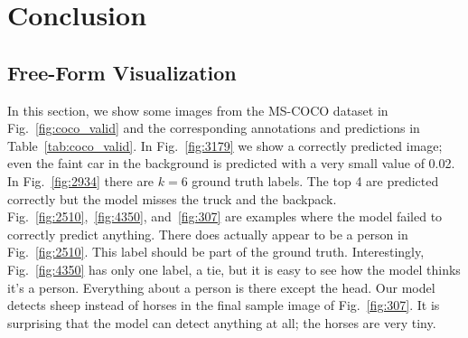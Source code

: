 \documentclass[12pt,journal,compsoc]{IEEEtran}
\begin{document}




\section{Conclusion} %
\subsection{Free-Form Visualization}



In this section, we show some images from the MS-COCO dataset in Fig.~\ref{fig:coco_valid} and the corresponding annotations and predictions in Table~\ref{tab:coco_valid}. In Fig.~\ref{fig:3179} we show a correctly predicted image; even the faint car in the background is predicted with a very small value of 0.02. In Fig.~\ref{fig:2934} there are $k=6$ ground truth labels. The top 4 are predicted correctly but the model misses the truck and the backpack. Fig.~\ref{fig:2510},~\ref{fig:4350}, and~\ref{fig:307} are examples where the model failed to correctly predict anything.  There does actually appear to be a person in Fig.~\ref{fig:2510}. This label should be part of the ground truth. Interestingly, Fig.~\ref{fig:4350} has only one label, a tie, but it is easy to see how the model thinks it's a person. Everything about a person is there except the head.  Our model detects sheep instead of horses in the final sample image of Fig.~\ref{fig:307}. It is surprising that the model can detect anything at all; the horses are very tiny.
\end{document}
